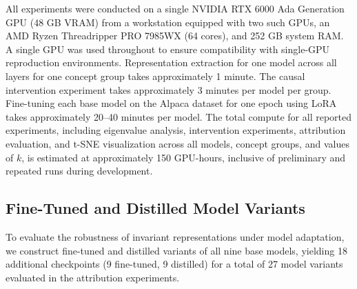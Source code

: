 All experiments were conducted on a single NVIDIA RTX 6000 Ada Generation GPU (48 GB VRAM) from a workstation equipped with two such GPUs, an AMD Ryzen Threadripper PRO 7985WX (64 cores), and 252 GB system RAM. A single GPU was used throughout to ensure compatibility with single-GPU reproduction environments. Representation extraction for one model across all layers for one concept group takes approximately 1 minute. The causal intervention experiment takes approximately 3 minutes per model per group. Fine-tuning each base model on the Alpaca dataset for one epoch using LoRA takes approximately 20--40 minutes per model. The total compute for all reported experiments, including eigenvalue analysis, intervention experiments, attribution evaluation, and t-SNE visualization across all models, concept groups, and values of $k$, is estimated at approximately 150 GPU-hours, inclusive of preliminary and repeated runs during development.

\subsection{Fine-Tuned and Distilled Model Variants}
\label{app:model_variants}

To evaluate the robustness of invariant representations under model adaptation, we construct fine-tuned and distilled variants of all nine base models, yielding 18 additional checkpoints (9 fine-tuned, 9 distilled) for a total of 27 model variants evaluated in the attribution experiments.

